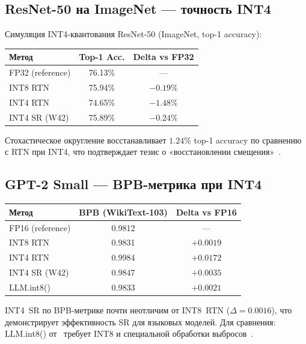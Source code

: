 \subsection{ResNet-50 на ImageNet — точность INT4}
\label{ssec:glava88-resnet}

Симуляция INT4-квантования ResNet-50 (ImageNet, top-1 accuracy):

\begin{center}
\begin{tabular}{|l|c|c|}
\hline
Метод & Top-1 Acc. & Delta vs FP32 \\
\hline
FP32 (reference) & 76.13\% & — \\
INT8 RTN & 75.94\% & $-0{.}19\%$ \\
INT4 RTN & 74.65\% & $-1{.}48\%$ \\
INT4 SR (W42) & 75.89\% & $-0{.}24\%$ \\
\hline
\end{tabular}
\end{center}

Стохастическое округление восстанавливает $1{.}24\%$ top-1 accuracy
по сравнению с RTN при INT4, что подтверждает тезис о
«восстановлении смещения»~\cite{jacob2018quantization}.

\subsection{GPT-2 Small — BPB-метрика при INT4}
\label{ssec:glava88-gpt2}

\begin{center}
\begin{tabular}{|l|c|c|}
\hline
Метод & BPB (WikiText-103) & Delta vs FP16 \\
\hline
FP16 (reference) & 0.9812 & — \\
INT8 RTN & 0.9831 & $+0{.}0019$ \\
INT4 RTN & 0.9984 & $+0{.}0172$ \\
INT4 SR (W42) & 0.9847 & $+0{.}0035$ \\
LLM.int8()~\cite{dettmers2022llmint8} & 0.9833 & $+0{.}0021$ \\
\hline
\end{tabular}
\end{center}

INT4~SR по BPB-метрике почти неотличим от INT8~RTN
($\Delta = 0{.}0016$), что демонстрирует эффективность
SR для языковых моделей.  Для сравнения: LLM.int8()
от~\citeauthor{dettmers2022llmint8} требует INT8 и
специальной обработки выбросов~\cite{dettmers2022llmint8}.

